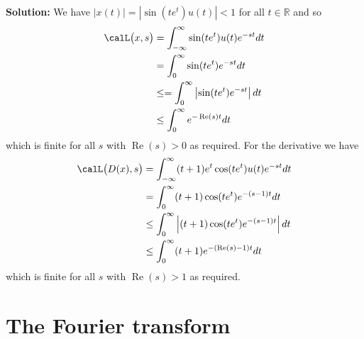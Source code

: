 \documentclass[11pt,a4paper]{book}
\theoremstyle{plain}
\numberwithin{equation}{section}
\newcommand{\reals}{{\mathbb R}}
\renewcommand{\Re}{\operatorname{Re}}
\newcommand{\abs}[1]{\left\vert #1 \right\vert}
\newenvironment{solution}{\begin{footnotesize}\textbf{Solution:}}{\end{footnotesize}}
\newenvironment{excersizelist}{%
  \renewcommand*{\theenumi}{\thechapter.\arabic{enumi}}%
  \newcommand\itemadvanced{\stepcounter{enumi}\item[$\ast$\, \theenumi.]}
  \begin{enumerate}
}{%
  \end{enumerate}
}
\begin{document}
\begin{excersizelist}
\begin{solution}
We have $\abs{x(t)} = \abs{\sin(t e^t) u(t)} < 1$ for all $t \in \reals$ and so
\begin{align*}
\calL\big( x , s\big) &= \int_{-\infty}^\infty \sin(t e^t) u(t) e^{-s t} dt \\
&= \int_{0}^\infty \sin(t e^t) e^{-s t}  dt \\
&\leq = \int_{0}^\infty \abs{\sin(t e^t) e^{-s t}}  dt \\
&\leq \int_{0}^\infty e^{-\Re(s) t}  dt
\end{align*}
which is finite for all $s$ with $\Re(s) > 0$ as required.  For the derivative we have
\begin{align*}
\calL\big( D(x) , s\big) &= \int_{-\infty}^\infty (t+1)e^t \cos(t e^t) u(t) e^{-s t} dt \\
&= \int_{0}^\infty (t+1) \cos(t e^t) e^{-(s-1) t}  dt \\
&\leq \int_{0}^\infty \abs{(t+1) \cos(t e^t) e^{-(s-1) t}}  dt \\
&\leq \int_{0}^\infty (t+1) e^{-(\Re(s)-1) t}  dt
\end{align*}
which is finite for all $s$ with $\Re(s) > 1$ as required.
\end{solution}


\end{excersizelist}



\chapter{The Fourier transform}\label{sec:fourier-transform}
\newcommand{\calF}{{\mathcal F}}


\end{document}
